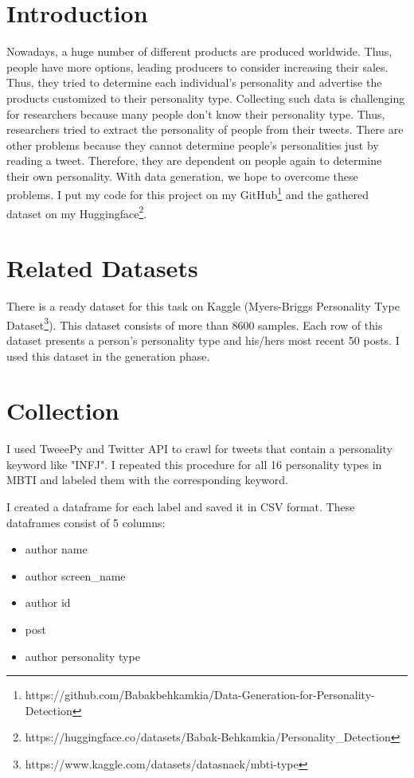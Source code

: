 \section{Introduction}
Nowadays, a huge number of different products are produced worldwide. Thus, people have more options, leading producers to consider increasing their sales. Thus, they tried to determine each individual's personality and advertise the products customized to their personality type. 
Collecting such data is challenging for researchers because many people don't know their personality type. Thus, researchers tried to extract the personality of people from their tweets. There are other problems because they cannot determine people's personalities just by reading a tweet. Therefore, they are dependent on people again to determine their own personality.
With data generation, we hope to overcome these problems. I put my code for this project on my GitHub\footnote{https://github.com/Babakbehkamkia/Data-Generation-for-Personality-Detection} and the gathered dataset on my Huggingface\footnote{https://huggingface.co/datasets/Babak-Behkamkia/Personality_Detection}.



\section{Related Datasets}
There is a ready dataset for this task on Kaggle (Myers-Briggs Personality Type Dataset\footnote{https://www.kaggle.com/datasets/datasnaek/mbti-type}). This dataset consists of more than 8600 samples. Each row of this dataset presents a person's personality type and his/hers most recent 50 posts. I used this dataset in the generation phase.

\section{Collection}
I used TweeePy and Twitter API to crawl for tweets that contain a personality keyword like "INFJ". I repeated this procedure for all 16 personality types in MBTI and labeled them with the corresponding keyword.

I created a dataframe for each label and saved it in CSV format. These dataframes consist of 5 columns:
\begin{itemize}
    \item author name
    \item author screen\_name
    \item author id
    \item post
    \item author personality type
\end{itemize}

